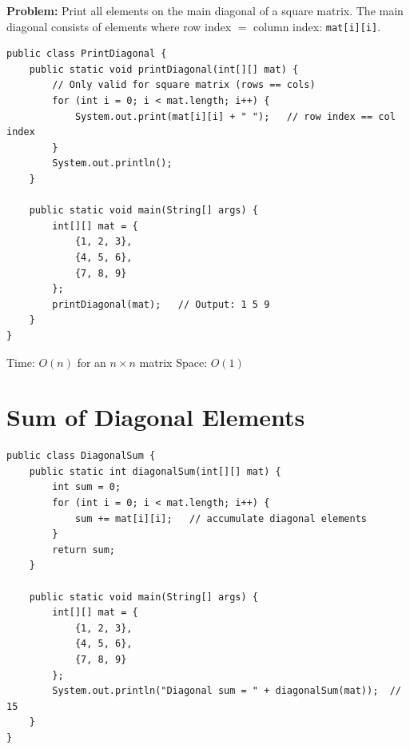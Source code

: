 \documentclass[12pt,a4paper,oneside]{book}
\begin{document}
\textbf{Problem:} Print all elements on the main diagonal of a square matrix. The main diagonal consists of elements where row index $=$ column index: \texttt{mat[i][i]}.

\begin{center}
\end{center}

\begin{lstlisting}[caption={Print Diagonal Elements}]
public class PrintDiagonal {
    public static void printDiagonal(int[][] mat) {
        // Only valid for square matrix (rows == cols)
        for (int i = 0; i < mat.length; i++) {
            System.out.print(mat[i][i] + " ");   // row index == col index
        }
        System.out.println();
    }

    public static void main(String[] args) {
        int[][] mat = {
            {1, 2, 3},
            {4, 5, 6},
            {7, 8, 9}
        };
        printDiagonal(mat);   // Output: 1 5 9
    }
}
\end{lstlisting}

\begin{complexity}
Time: $O(n)$ for an $n \times n$ matrix \quad Space: $O(1)$
\end{complexity}

\section{Sum of Diagonal Elements}

\begin{lstlisting}[caption={Diagonal Sum --- main diagonal only}]
public class DiagonalSum {
    public static int diagonalSum(int[][] mat) {
        int sum = 0;
        for (int i = 0; i < mat.length; i++) {
            sum += mat[i][i];   // accumulate diagonal elements
        }
        return sum;
    }

    public static void main(String[] args) {
        int[][] mat = {
            {1, 2, 3},
            {4, 5, 6},
            {7, 8, 9}
        };
        System.out.println("Diagonal sum = " + diagonalSum(mat));  // 15
    }
}
\end{lstlisting}
\end{document}
